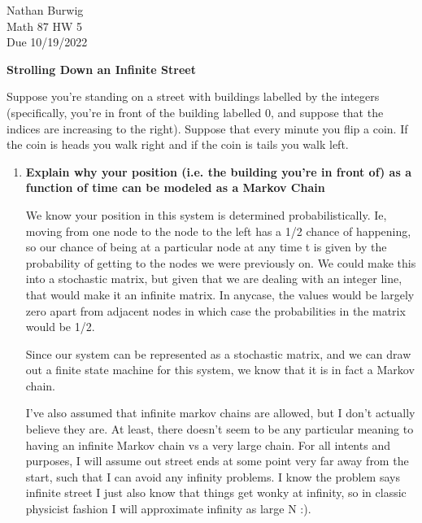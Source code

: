 \documentclass[11pt]{article}
\begin{document}
    \noindent Nathan Burwig \\
    Math 87 HW 5 \\
    Due 10/19/2022
    
    \hrulefill

    \textbf{Strolling Down an Infinite Street}

        Suppose you’re standing on a street with buildings labelled by 
        the integers (specifically, you’re in front of the building labelled 
        0, and suppose that the indices are increasing to the right). 
        Suppose that every minute you flip a coin. If the coin is heads 
        you walk right and if the coin is tails you walk left.
    
    \begin{enumerate}
        \item \textbf{Explain why your position (i.e. the building you’re in front of) 
            as a function of time can be modeled as a Markov Chain}

            We know your position in this system is determined
            probabilistically. Ie, moving from one node to the node to the left has a 1/2
            chance of happening, so our chance of being at a particular node at
            any time t is given by the probability of getting to the nodes we
            were previously on. We could make this into a stochastic matrix,
            but given that we are dealing with an integer line, that would make
            it an infinite matrix. In anycase, the values would be largely zero
            apart from adjacent nodes in which case the probabilities in the
            matrix would be 1/2.

            Since our system can be represented as a stochastic matrix, and we
            can draw out a finite state machine for this system, we know that
            it is in fact a Markov chain.

            I've also assumed that infinite markov chains are allowed, but I
            don't actually believe they are. At least, there doesn't seem to be
            any particular meaning to having an infinite Markov chain vs a very
            large chain. For all intents and purposes, I will assume out street
            ends at some point very far away from the start, such that I can
            avoid any infinity problems. I know the problem says infinite
            street I just also know that things get wonky at infinity, so in
            classic physicist fashion I will approximate infinity as large N :).
            \medskip


\end{enumerate}
\end{document}
